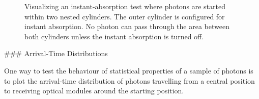 \begin{figure}[htbp]
  \hfill
  \hfill
  \caption{Visualizing an instant-absorption test where photons are started within two nested cylinders. The outer cylinder is configured for instant absorption. No photon can pass through the area between both cylinders unless the instant absorption is turned off.}
  \label{fig:sahmoo8O}
\end{figure}


### Arrival-Time Distributions


One way to test the behaviour of statistical properties of a sample of photons is to plot the arrival-time distribution of photons travelling from a central position to receiving optical modules around the starting position.


